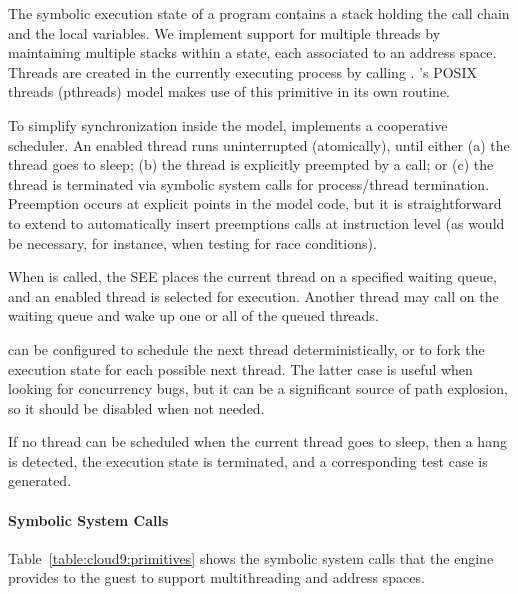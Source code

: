 The symbolic execution state of a program contains a stack holding the call chain and the local variables.
%
We implement support for multiple threads by maintaining multiple stacks within a state, each associated to an address space.
%
Threads are created in the currently executing process by calling .  \cnine's POSIX threads (pthreads) model makes use of this primitive in its own  routine.

To simplify synchronization inside the model, \cnine implements a cooperative scheduler.
%
An enabled thread runs uninterrupted (atomically), until either (a) the thread goes to sleep; (b) the thread is explicitly preempted by a  call; or (c) the thread is terminated via symbolic system calls for process/thread termination. Preemption occurs at explicit points in the model code, but it is straightforward to extend \cnine to automatically insert preemptions calls at instruction level (as would be necessary, for instance, when testing for race conditions).

When  is called, the SEE places the current thread on a specified waiting queue, and an enabled thread is selected for execution.
%
Another thread may call  on the waiting queue and wake up one or all of the queued threads.

\cnine can be configured to schedule the next thread deterministically, or to fork the execution state for each possible next thread.
%
The latter case is useful when looking for concurrency bugs, but it can be a significant source of path explosion, so it should be disabled when not needed.

If no thread can be scheduled when the current thread goes to sleep, then a hang is detected, the execution state is terminated,  and a corresponding test case is generated.

\paragraph{Symbolic System Calls}

Table~\ref{table:cloud9:primitives} shows the symbolic system calls that the engine provides to the guest to support multithreading and address spaces.

